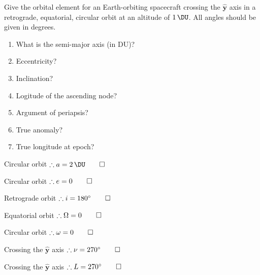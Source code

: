 \begin{hwkProblem}{6}{}

	Give the orbital element for an Earth-orbiting spacecraft crossing the \( \bm{\hat{y}} \) axis in a retrograde, equatorial, circular orbit at an altitude of \( \qty{1}{\DU} \). All angles should be given in degrees.
	\begin{enumerate}
		\item What is the semi-major axis (in DU)?
		\item Eccentricity?
		\item Inclination?
		\item Logitude of the ascending node?
		\item Argument of periapsis?
		\item True anomaly?
		\item True longitude at epoch?
	\end{enumerate}

	\hwkSol

	\hwkPart

	Circular orbit \( \therefore a = \qty{2}{\DU} \qed \)

	\hwkPart

	Circular orbit \( \therefore e = 0 \qed \)

	\hwkPart

	Retrograde orbit \( \therefore i = \qty{180}{\degree} \qed \)

	\hwkPart

	Equatorial orbit \( \therefore \Omega = 0 \qed \)

	\hwkPart

	Circular orbit \( \therefore \omega = 0 \qed \)

	\hwkPart

	Crossing the \( \bm{\hat{y}} \) axis \( \therefore \nu = \qty{270}{\degree} \qed \)

	\hwkPart

	Crossing the \( \bm{\hat{y}} \) axis \( \therefore L = \qty{270}{\degree} \qed \)

\end{hwkProblem}
